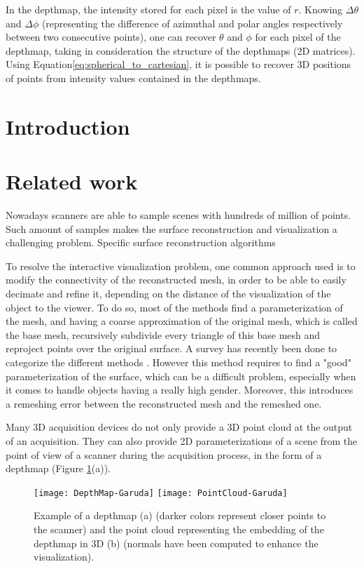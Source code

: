 \documentclass[11pt,fleqn]{book} %
\begin{document}
In the depthmap, the intensity stored for each pixel is the value of $r$. Knowing $\Delta\theta$ and $\Delta\phi$ (representing the difference of azimuthal and polar angles respectively between two consecutive points), one can recover $\theta$ and $\phi$ for each pixel of the depthmap, taking in consideration the structure of the depthmaps (2D matrices). 
Using Equation\eqref{eq:spherical_to_cartesian}, it is possible to recover 3D positions of points from intensity values contained in the depthmaps.

\section{Introduction}
\label{sec:introduction}

\section{Related work}
\label{sec:related_work}

Nowadays scanners are able to sample scenes with hundreds of million of points. Such amount of samples makes the surface reconstruction and visualization a challenging problem.
Specific surface reconstruction algorithms 

To resolve the interactive visualization problem, one common approach used is to modify the connectivity of the reconstructed mesh, in order to be able to easily decimate and refine it, depending on the distance of the visualization of the object to the viewer.
To do so, most of the methods find a parameterization of the mesh, and having a coarse approximation of the original mesh, which is called the base mesh, recursively subdivide every triangle of this base mesh and reproject points over the original surface. A survey has recently been done to categorize the different methods \cite{PRS15}.
However this method requires to find a "good" parameterization of the surface, which can be a difficult problem, especially when it comes to handle objects having a really high gender.
Moreover, this introduces a remeshing error between the reconstructed mesh and the remeshed one.

Many 3D acquisition devices do not only provide a 3D point cloud at the output of an acquisition. They can also provide 2D parameterizations of a scene from the point of view of a scanner during the acquisition process, in the form of a depthmap (Figure \ref{fig:depthmap_point_cloud}(a)).

\begin{figure}[ht]
\centering\texttt{[image: DepthMap-Garuda]}
\centering\texttt{[image: PointCloud-Garuda]}
\caption{Example of a depthmap (a) (darker colors represent closer points to the scanner) and the point cloud representing the embedding of the depthmap in 3D (b) (normals have been computed to enhance the visualization).}
\label{fig:depthmap_point_cloud}
\end{figure}
\end{document}
